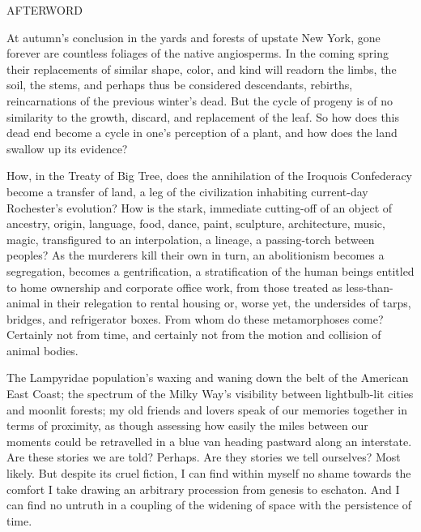 \documentclass[12pt]{article}
\begin{document}
\vspace*{15\baselineskip}

\begingroup
\begin{center}
\huge AFTERWORD
\end{center}
\endgroup

\begingroup
\hspace{5mm} At autumn's conclusion in the yards and forests of upstate New York, gone forever are countless foliages of the native angiosperms. In the coming spring their replacements of similar shape, color, and kind will readorn the limbs, the soil, the stems, and perhaps thus be considered descendants, rebirths, reincarnations of the previous winter's dead. But the cycle of progeny is of no similarity to the growth, discard, and replacement of the leaf. So how does this dead end become a cycle in one's perception of a plant, and how does the land swallow up its evidence? \\
\endgroup

\begingroup
\hspace{5mm} How, in the Treaty of Big Tree, does the annihilation of the Iroquois Confederacy become a transfer of land, a leg of the civilization inhabiting current-day Rochester's evolution? How is the stark, immediate cutting-off of an object of ancestry, origin, language, food, dance, paint, sculpture, architecture, music, magic, transfigured to an interpolation, a lineage, a passing-torch between peoples? As the murderers kill their own in turn, an abolitionism becomes a segregation, becomes a gentrification, a stratification of the human beings entitled to home ownership and corporate office work, from those treated as less-than-animal in their relegation to rental housing or, worse yet, the undersides of tarps, bridges, and refrigerator boxes. From whom do these metamorphoses come? Certainly not from time, and certainly not from the motion and collision of animal bodies. \\
\endgroup

\begingroup
\hspace{5mm} The Lampyridae population's waxing and waning down the belt of the American East Coast; the spectrum of the Milky Way's visibility between lightbulb-lit cities and moonlit forests; my old friends and lovers speak of our memories together in terms of proximity, as though assessing how easily the miles between our moments could be retravelled in a blue van heading pastward along an interstate. Are these stories we are told? Perhaps. Are they stories we tell ourselves? Most likely. But despite its cruel fiction, I can find within myself no shame towards the comfort I take drawing an arbitrary procession from genesis to eschaton. And I can find no untruth in a coupling of the widening of space with the persistence of time. \\
\endgroup
\end{document}
